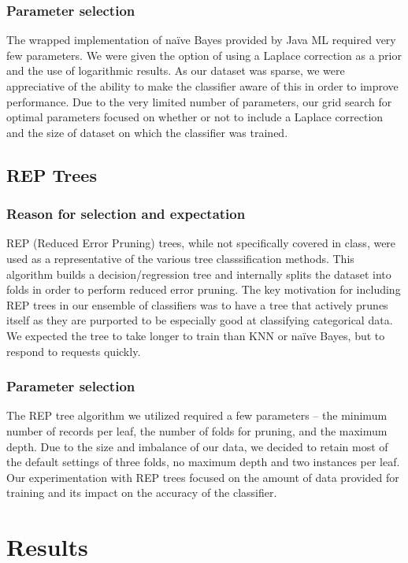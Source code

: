 \documentclass[]{article}   %
\begin{document}
\subsubsection{Parameter selection}
The wrapped implementation of na\"{i}ve Bayes provided by Java ML required very few parameters. We were given the 
option of using a Laplace correction as a prior and the use of logarithmic results. As our dataset was sparse, we 
were appreciative of the ability to make the classifier aware of this in order to improve performance. Due to the 
very limited number of parameters, our grid search for optimal parameters focused on whether or not to include a 
Laplace correction and the size of dataset on which the classifier was trained. 

\subsection{REP Trees}
\subsubsection{Reason for selection and expectation}
REP (Reduced Error Pruning) trees, while not specifically covered in class, were used as a representative of the 
various tree classsification methods. This algorithm builds a decision/regression tree and internally splits the 
dataset into folds in order to perform reduced error pruning. The key motivation for including REP trees in our 
ensemble of classifiers was to have a tree that actively prunes itself as they are purported to be especially good 
at classifying categorical data. We expected the tree to take longer to train than KNN or na\"{i}ve Bayes, but to 
respond to requests quickly.

\subsubsection{Parameter selection}
The REP tree algorithm we utilized required a few parameters -- the minimum number of records per leaf, the number 
of folds for pruning, and the maximum depth. Due to the size and imbalance of our data, we decided to retain most 
of the default settings of three folds, no maximum depth and two instances per leaf. Our experimentation with REP 
trees focused on the amount of data provided for training and its impact on the accuracy of the classifier.

\section{Results}
\end{document}
